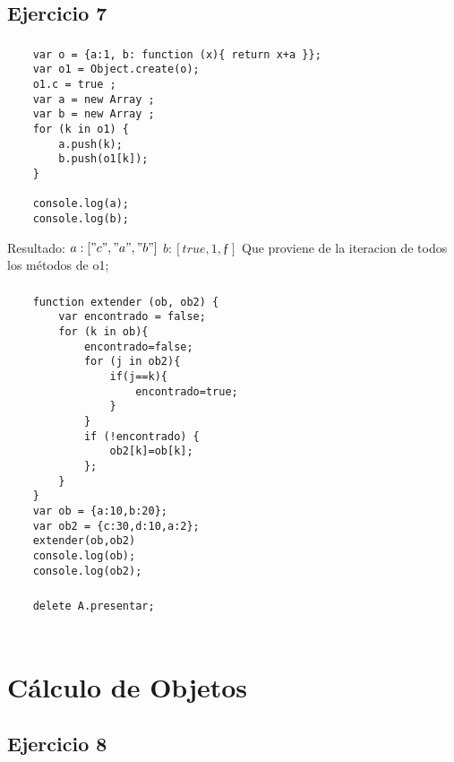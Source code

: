 \documentclass[10pt,a4paper]{article}
\begin{document}
\subsection{Ejercicio 7}
\subsubsection{}
    \begin{lstlisting}
    var o = {a:1, b: function (x){ return x+a }};
    var o1 = Object.create(o);
    o1.c = true ;
    var a = new Array ;
    var b = new Array ;
    for (k in o1) {
    	a.push(k); 
    	b.push(o1[k]);
    }
    
    console.log(a);
    console.log(b);
\end{lstlisting}
Resultado:
$a:["c", "a", "b"]$
$b:[true, 1, ƒ]$
Que proviene de la iteracion de todos los métodos de o1;
\subsubsection{}
    \begin{lstlisting}
    function extender (ob, ob2) {
    	var encontrado = false;
    	for (k in ob){
    		encontrado=false;
    		for (j in ob2){
    			if(j==k){
    				encontrado=true;
    			}
    		}
    		if (!encontrado) {
    			ob2[k]=ob[k];
    		};
    	} 
    }
    var ob = {a:10,b:20};
    var ob2 = {c:30,d:10,a:2};
    extender(ob,ob2)
    console.log(ob);
    console.log(ob2);
    \end{lstlisting}
\subsubsection{}
    \begin{lstlisting}
    delete A.presentar;
    \end{lstlisting}
\subsubsection{}
    \begin{lstlisting}
    \end{lstlisting}

\section*{\centering Cálculo de Objetos}

\subsection{Ejercicio 8}
\end{document}
